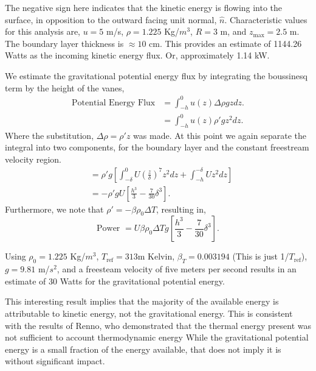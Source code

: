 
The negative sign here indicates that the kinetic energy is flowing into
the surface, in opposition to the outward facing unit normal, $\hat
n$. Characteristic values for this analysis are, $u = 5$ m/s, $\rho =
1.225$ Kg/$m^3$, $R = 3$ m, and $z_{\text{max}} = 2.5$ m. The boundary
layer thickness is $\approx 10$ cm. This provides
an estimate of 1144.26 Watts as the incoming kinetic energy flux. Or,
approximately 1.14 kW.  

We estimate the gravitational potential
energy flux by integrating the boussinesq term by the height of the vanes, 
\begin{align*}
  \text{Potential Energy Flux} & = \int_{-h}^0 u(z) \Delta \rho g z dz. \\
  & = \int_{-h}^0 u(z) \rho' g z^2 dz. 
\end{align*}
Where the substitution, $\Delta \rho = \rho' z$ was made. At 
this point we again separate the integral into two components, 
for the boundary layer and the constant freestream velocity region. 
\begin{align*}
  & = \rho' g \left[ \int_{-\delta}^{0} U \left( \frac{z}{\delta} \right)^7 z^2 dz 
      + \int_{-h}^{-\delta} U z^2 dz \right] \\
  & = -\rho' g U \left[ \frac{h^3}{3} - \frac{7}{30} \delta^3 \right].
\end{align*}
Furthermore, we
note that $\rho' = -\beta \rho_0 \Delta T$, resulting in, 
%
%
\begin{equation}
 \text{Power } = U \beta \rho_0 \Delta T g \left[ \frac{h^3}{3} -
					    \frac{7}{30} \delta^3
					   \right]. 
\end{equation}

Using $\rho_0 = 1.225$ Kg/$m^3$, $T_{\text{ref}}=313$m Kelvin, $\beta_T = 0.003194$
(This is just 1/$T_{\text{ref}}$), $g=9.81$ m/$s^2$, and a freesteam
velocity of five meters per second results in an
estimate of 30 Watts for the gravitational potential energy. 

This interesting result implies that the majority of the available
energy is attributable to kinetic energy, not the gravitational
energy. This is consistent with the results of Renno\cite{}, who demonstrated
that the thermal energy present was not sufficient to account 
thermodynamic energy 
%
%
While the gravitational potential energy is a small fraction of the
energy available, that does not imply it is without significant impact.
%
